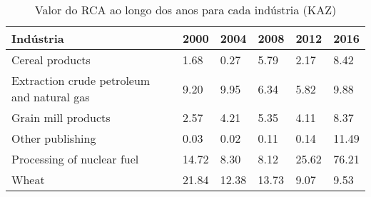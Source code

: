 \begin{table}
\centering
\caption{Valor do RCA ao longo dos anos para cada indústria (KAZ)}
\begin{tabular}{p{6cm}p{1.5cm}p{1.5cm}p{1.5cm}p{1.5cm}p{1.5cm}}
\toprule
                                 Indústria &  2000 &  2004 &  2008 &  2012 &  2016 \\
\midrule
                           Cereal products &  1.68 &  0.27 &  5.79 &  2.17 &  8.42 \\
Extraction crude petroleum and natural gas &  9.20 &  9.95 &  6.34 &  5.82 &  9.88 \\
                       Grain mill products &  2.57 &  4.21 &  5.35 &  4.11 &  8.37 \\
                          Other publishing &  0.03 &  0.02 &  0.11 &  0.14 & 11.49 \\
                Processing of nuclear fuel & 14.72 &  8.30 &  8.12 & 25.62 & 76.21 \\
                                     Wheat & 21.84 & 12.38 & 13.73 &  9.07 &  9.53 \\
\bottomrule
\end{tabular}
\end{table}
